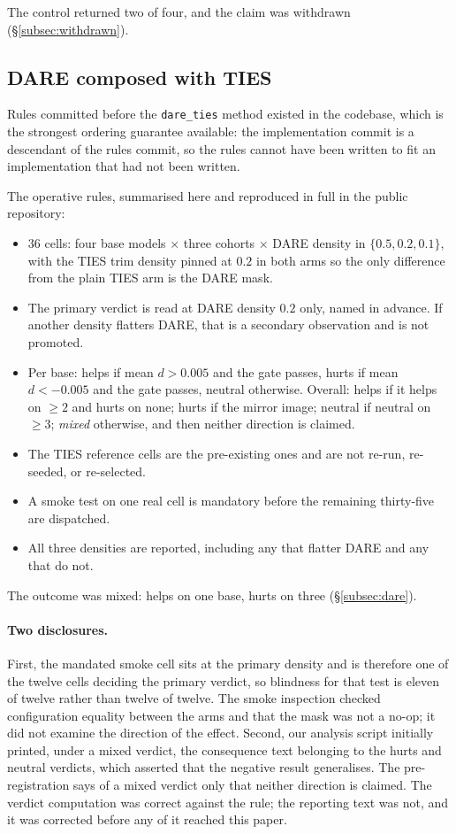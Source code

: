 The control returned two of four, and the claim was withdrawn
(\S\ref{subsec:withdrawn}).

\subsection{DARE composed with TIES}

Rules committed before the \texttt{dare\_ties} method existed in the
codebase, which is the strongest ordering guarantee available: the
implementation commit is a descendant of the rules commit, so the rules
cannot have been written to fit an implementation that had not been
written.

The operative rules, summarised here and reproduced in full in the
public repository:
\begin{itemize}
\item $36$ cells: four base models $\times$ three cohorts $\times$ DARE
  density in $\{0.5, 0.2, 0.1\}$, with the TIES trim density pinned at
  $0.2$ in both arms so the only difference from the plain TIES arm is
  the DARE mask.
\item The primary verdict is read at DARE density $0.2$ only, named in
  advance. If another density flatters DARE, that is a secondary
  observation and is not promoted.
\item Per base: helps if mean $d > 0.005$ and the gate passes, hurts if
  mean $d < -0.005$ and the gate passes, neutral otherwise. Overall:
  helps if it helps on $\geq 2$ and hurts on none; hurts if the mirror
  image; neutral if neutral on $\geq 3$; \emph{mixed} otherwise, and then
  neither direction is claimed.
\item The TIES reference cells are the pre-existing ones and are not
  re-run, re-seeded, or re-selected.
\item A smoke test on one real cell is mandatory before the remaining
  thirty-five are dispatched.
\item All three densities are reported, including any that flatter DARE
  and any that do not.
\end{itemize}

The outcome was mixed: helps on one base, hurts on three
(\S\ref{subsec:dare}).

\paragraph{Two disclosures.} First, the mandated smoke cell sits at the
primary density and is therefore one of the twelve cells deciding the
primary verdict, so blindness for that test is eleven of twelve rather
than twelve of twelve. The smoke inspection checked configuration
equality between the arms and that the mask was not a no-op; it did not
examine the direction of the effect. Second, our analysis script
initially printed, under a mixed verdict, the consequence text belonging
to the hurts and neutral verdicts, which asserted that the negative
result generalises. The pre-registration says of a mixed verdict only
that neither direction is claimed. The verdict computation was correct
against the rule; the reporting text was not, and it was corrected before
any of it reached this paper.

